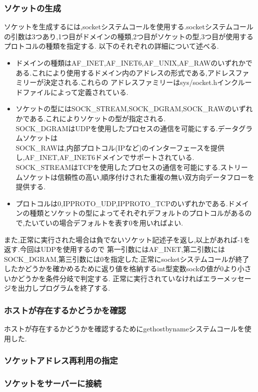 \documentclass[dvipdfmx]{jarticle}
\begin{document}
\subsubsection{ソケットの生成}
ソケットを生成するには,socketシステムコールを使用する.socketシステムコールの引数は3つあり,1つ目がドメインの種類,2つ目がソケットの型,3つ目が使用するプロトコルの種類を指定する.
以下のそれぞれの詳細について述べる.\cite{2}\cite{3}
\begin{itemize}
    \item ドメインの種類はAF\_INET,AF\_INET6,AF\_UNIX,AF\_RAWのいずれかである.これにより使用するドメイン内のアドレスの形式である,アドレスファミリーが決定される.これらの
    アドレスファミリーはsys/socket.hインクルードファイルによって定義されている.
    \item ソケットの型にはSOCK\_STREAM,SOCK\_DGRAM,SOCK\_RAWのいずれかである.これによりソケットの型が指定される.
    \\SOCK\_DGRAMはUDPを使用したプロセスの通信を可能にする.データグラムソケットは
    \\SOCK\_RAWは,内部プロトコル(IPなど)のインターフェースを提供し,AF\_INET,AF\_INET6ドメインでサポートされている.
    \\SOCK\_STREAMはTCPを使用したプロセスの通信を可能にする.ストリームソケットは信頼性の高い,順序付けされた重複の無い双方向データフローを提供する.
    \item プロトコルは0,IPPROTO\_UDP,IPPROTO\_TCPのいずれかである.ドメインの種類とソケットの型によってそれぞれデフォルトのプロトコルがあるので,たいていの場合デフォルトを表す0を用いればよい.
\end{itemize}
また,正常に実行された場合は負でないソケット記述子を返し,以上があれば-1を返す.今回はUDPを使用するので
第一引数にはAF\_INET,第二引数にはSOCK\_DGRAM,第三引数には0を指定した.正常にsocketシステムコールが終了したかどうかを確かめるために返り値を格納するint型変数sockの値が0より小さいかどうかを条件分岐で判定する.
正常に実行されていなければエラーメッセージを出力しプログラムを終了する.
\subsubsection{ホストが存在するかどうかを確認}
ホストが存在するかどうかを確認するためにgethostbynameシステムコールを使用した.
\subsubsection{ソケットアドレス再利用の指定}
\subsubsection{ソケットをサーバーに接続}
\end{document}
